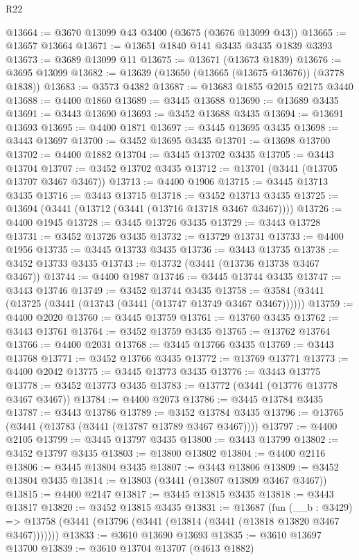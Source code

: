 \begin{lexlean}{R22}
\begin{coremodule}
@13664 := @3670 @13099 @43 @3400 (@3675 (@3676 @13099 @43))
@13665 := @13657 @13664
@13671 := @13651 @1840 @141 @3435 @3435 @1839 @3393
@13673 := @3689 @13099 @11
@13675 := @13671 (@13673 @1839)
@13676 := @3695 @13099
@13682 := @13639 (@13650 (@13665 (@13675 @13676)) (@3778 @1838))
@13683 := @3573 @4382
@13687 := @13683 @1855 @2015 @2175 @3440
@13688 := @4400 @1860
@13689 := @3445 @13688
@13690 := @13689 @3435
@13691 := @3443 @13690
@13693 := @3452 @13688 @3435
@13694 := @13691 @13693
@13695 := @4400 @1871
@13697 := @3445 @13695 @3435
@13698 := @3443 @13697
@13700 := @3452 @13695 @3435
@13701 := @13698 @13700
@13702 := @4400 @1882
@13704 := @3445 @13702 @3435
@13705 := @3443 @13704
@13707 := @3452 @13702 @3435
@13712 := @13701 (@3441 (@13705 @13707 @3467 @3467))
@13713 := @4400 @1906
@13715 := @3445 @13713 @3435
@13716 := @3443 @13715
@13718 := @3452 @13713 @3435
@13725 := @13694 (@3441 (@13712 (@3441 (@13716 @13718 @3467 @3467))))
@13726 := @4400 @1945
@13728 := @3445 @13726 @3435
@13729 := @3443 @13728
@13731 := @3452 @13726 @3435
@13732 := @13729 @13731
@13733 := @4400 @1956
@13735 := @3445 @13733 @3435
@13736 := @3443 @13735
@13738 := @3452 @13733 @3435
@13743 := @13732 (@3441 (@13736 @13738 @3467 @3467))
@13744 := @4400 @1987
@13746 := @3445 @13744 @3435
@13747 := @3443 @13746
@13749 := @3452 @13744 @3435
@13758 := @3584 (@3441 (@13725 (@3441 (@13743 (@3441 (@13747 @13749 @3467 @3467))))))
@13759 := @4400 @2020
@13760 := @3445 @13759
@13761 := @13760 @3435
@13762 := @3443 @13761
@13764 := @3452 @13759 @3435
@13765 := @13762 @13764
@13766 := @4400 @2031
@13768 := @3445 @13766 @3435
@13769 := @3443 @13768
@13771 := @3452 @13766 @3435
@13772 := @13769 @13771
@13773 := @4400 @2042
@13775 := @3445 @13773 @3435
@13776 := @3443 @13775
@13778 := @3452 @13773 @3435
@13783 := @13772 (@3441 (@13776 @13778 @3467 @3467))
@13784 := @4400 @2073
@13786 := @3445 @13784 @3435
@13787 := @3443 @13786
@13789 := @3452 @13784 @3435
@13796 := @13765 (@3441 (@13783 (@3441 (@13787 @13789 @3467 @3467))))
@13797 := @4400 @2105
@13799 := @3445 @13797 @3435
@13800 := @3443 @13799
@13802 := @3452 @13797 @3435
@13803 := @13800 @13802
@13804 := @4400 @2116
@13806 := @3445 @13804 @3435
@13807 := @3443 @13806
@13809 := @3452 @13804 @3435
@13814 := @13803 (@3441 (@13807 @13809 @3467 @3467))
@13815 := @4400 @2147
@13817 := @3445 @13815 @3435
@13818 := @3443 @13817
@13820 := @3452 @13815 @3435
@13831 := @13687
    (fun (__b : @3429) =>
    @13758 (@3441 (@13796 (@3441 (@13814 (@3441 (@13818 @13820 @3467 @3467)))))))
@13833 := @3610 @13690 @13693
@13835 := @3610 @13697 @13700
@13839 := @3610 @13704 @13707 (@4613 @1882)

\end{coremodule}
\end{lexlean}

